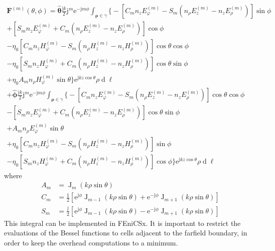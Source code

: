 \documentclass[a4paper,12pt]{article}
\renewcommand{\vec}[1]{\boldsymbol{#1}}
\newcommand{\unitvec}[1]{\hat{\vec{#1}}}
\newcommand{\mrm}[1]{\mathrm{#1}}
\newcommand{\diff}{\operatorname{d}\!}
\newcommand{\ju}{\mrm{j}}
\newcommand{\eu}{\mrm{e}}
\newcommand{\Fv}{\vec{F}}
\newcommand{\thetauv}{\unitvec{\theta}}
\newcommand{\phiuv}{\unitvec{\phi}}
\newcommand{\BesselJ}{\operatorname{J}}
\begin{document}
\begin{multline}
  \Fv^{(m)}(\theta,\phi) = \thetauv\frac{\ju k}{2}\ju^{m}\eu^{-\ju
    m\phi} \int_{\vec{\rho}\in\gamma} \Big\{ - \left[ C_{m}
    n_{z}E_{\varphi}^{(m)}
    - S_{m} (n_{\rho}E_{z}^{(m)} - n_{z}E_{\rho}^{(m)}) \right] \sin\phi \\
  + \left[ S_{m} n_{z}E_{\varphi}^{(m)}
    + C_{m} (n_{\rho}E_{z}^{(m)} - n_{z}E_{\rho}^{(m)}) \right] \cos\phi \\
  - \eta_{0} \left[ C_{m} n_{z}H_{\varphi}^{(m)}
    - S_{m} (n_{\rho}H_{z}^{(m)} - n_{z}H_{\rho}^{(m)}) \right] \cos\theta\cos\phi \\
  - \eta_{0}\left[ S_{m} n_{z}H_{\varphi}^{(m)}
    + C_{m} (n_{\rho}H_{z}^{(m)} - n_{z}H_{\rho}^{(m)}) \right] \cos\theta\sin\phi \\
  + \eta_{0} A_{m} n_{\rho}H_{\varphi}^{(m)}
  \sin\theta \Big\} \eu^{\ju kz\cos\theta} \rho\diff\ell \\
  + \phiuv \frac{\ju k}{2} \ju^{m}\eu^{-\ju
    m\phi}\int_{\vec{\rho}\in\gamma} \Big\{ - \left[ C_{m}
    n_{z}E_{\varphi}^{(m)}
    - S_{m} (n_{\rho}E_{z}^{(m)} - n_{z}E_{\rho}^{(m)}) \right] \cos\theta\cos\phi \\
  - \left[ S_{m} n_{z}E_{\varphi}^{(m)}
    + C_{m} (n_{\rho}E_{z}^{(m)} - n_{z}E_{\rho}^{(m)}) \right] \cos\theta\sin\phi \\
  + A_{m} n_{\rho}E_{\varphi}^{(m)} \sin\theta \\
  + \eta_{0} \left[ C_{m} n_{z}H_{\varphi}^{(m)}
    - S_{m} (n_{\rho}H_{z}^{(m)} - n_{z}H_{\rho}^{(m)}) \right] \sin\phi \\
  - \eta_{0}\left[ S_{m} n_{z}H_{\varphi}^{(m)} +
    C_{m} (n_{\rho}H_{z}^{(m)} -
    n_{z}H_{\rho}^{(m)}) \right] \cos\phi \Big\} \eu^{\ju kz\cos\theta}
  \rho\diff\ell
\end{multline}
where
\begin{align}
  A_{m} &= \BesselJ_{m}(k\rho\sin\theta) \\
  C_{m} &= \frac{1}{2}\left[ \eu^{\ju\phi}\BesselJ_{m-1}(k\rho\sin\theta) + \eu^{-\ju\phi}\BesselJ_{m+1}(k\rho\sin\theta) \right] \\
  S_{m} &= \frac{\ju}{2}\left[ \eu^{\ju\phi}\BesselJ_{m-1}(k\rho\sin\theta) - \eu^{-\ju\phi}\BesselJ_{m+1}(k\rho\sin\theta) \right]
\end{align}
This integral can be implemented in FEniCSx. It is important to
restrict the evaluations of the Bessel functions to cells adjacent to
the farfield boundary, in order to keep the overhead computations to a
minimum. 
\end{document}
